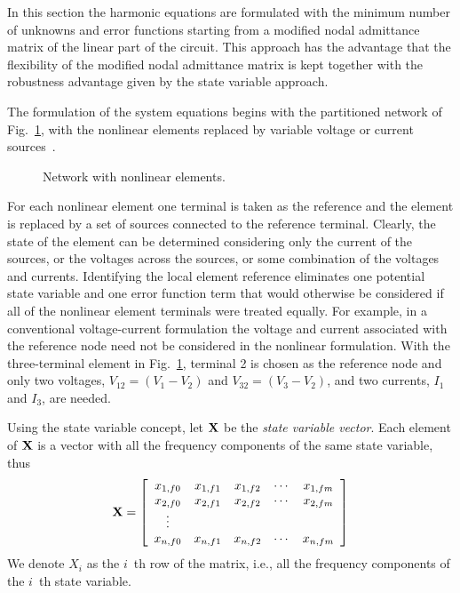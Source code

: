 In this section the harmonic equations are formulated with the minimum
number of unknowns and error functions starting from a modified nodal
admittance matrix of the linear part of the circuit.  This approach
has the advantage that the flexibility of the modified nodal
admittance matrix is kept together with the robustness advantage given
by the state variable approach.


The formulation of the system equations begins with the partitioned
network of Fig.~\ref{fig:network}, with the nonlinear elements
replaced by variable voltage or current
sources~\cite{nakhla:vlach:76}.
%
\begin{figure}[htpb]
\centerline{\epsfxsize=3in }
\caption{Network with nonlinear elements.} \label{fig:network}
\end{figure}
%
For each nonlinear element one terminal is taken as the reference and
the element is replaced by a set of sources connected to the reference
terminal. Clearly, the state of the element can be determined
considering only the current of the sources, or the voltages across
the sources, or some combination of the voltages and currents.
Identifying the local element reference eliminates one potential state
variable and one error function term that would otherwise be
considered if all of the nonlinear element terminals were treated
equally. For example, in a conventional voltage-current formulation
the voltage and current associated with the reference node need not be
considered in the nonlinear formulation. With the three-terminal
element in Fig.~\ref{fig:network}, terminal 2 is chosen as the
reference node and only two voltages, $V_{12} = (V_1 - V_2)$ and
$V_{32} = (V_3 - V_2)$, and two currents, $I_1$ and $I_3$, are needed.

Using the state variable concept, let ${\bf X}$ be the {\em state
variable vector}. Each element of ${\bf X}$ is a vector with all the
frequency components of the same state variable, thus
%
\begin{equation}
  {\bf X} = \left[ \begin{array}{ccccc}
  x_{1,f0} & x_{1,f1} & x_{1,f2} & \cdots & x_{1,fm} \\
  x_{2,f0} & x_{2,f1} & x_{2,f2} & \cdots & x_{2,fm} \\
  \vdots \\
  x_{n,f0} & x_{n,f1} & x_{n,f2} & \cdots & x_{n,fm} 
  \end{array} \right]
\end{equation}
%
We denote $X_i$ as the $i$~th row of the matrix, i.e., all the
frequency components of the $i$~th state variable. 

